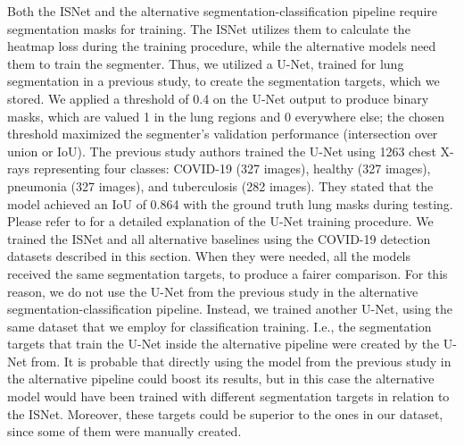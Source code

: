 \documentclass[fleqn,10pt]{wlscirep}
\begin{document}
{Both the ISNet and the alternative segmentation-classification pipeline require segmentation masks for training. The ISNet utilizes them to calculate the heatmap loss during the training procedure, while the alternative models need them to train the segmenter. Thus, we utilized a U-Net, trained for lung segmentation in a previous study\cite{bassi2021covid19}, to create the segmentation targets, which we stored. We applied a threshold of 0.4 on the U-Net output to produce binary masks, which are valued 1 in the lung regions and 0 everywhere else; the chosen threshold maximized the segmenter's validation performance (intersection over union or IoU). The previous study authors\cite{bassi2021covid19} trained the U-Net using 1263 chest X-rays representing four classes: COVID-19 (327 images), healthy (327 images), pneumonia (327 images), and tuberculosis (282 images). They stated that the model achieved an IoU of 0.864 with the ground truth lung masks during testing. Please refer to\cite{bassi2021covid19} for a detailed explanation of the U-Net training procedure. We trained the ISNet and all alternative baselines using the COVID-19 detection datasets described in this section. When they were needed, all the models received the same segmentation targets, to produce a fairer comparison. For this reason, we do not use the U-Net from the previous study\cite{bassi2021covid19} in the alternative segmentation-classification pipeline. Instead, we trained another U-Net, using the same dataset that we employ for classification training. I.e., the segmentation targets that train the U-Net inside the alternative pipeline were created by the U-Net from\cite{bassi2021covid19}. It is probable that directly using the model from the previous study\cite{bassi2021covid19} in the alternative pipeline could boost its results, but in this case the alternative model would have been trained with different segmentation targets in relation to the ISNet. Moreover, these targets could be superior to the ones in our dataset, since some of them were manually created\cite{bassi2021covid19}.

}
\end{document}
